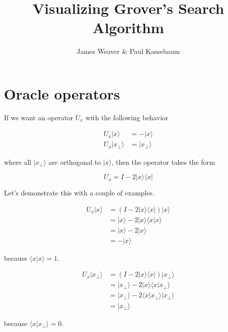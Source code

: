 \documentclass[12pt]{amsart}
\title{Visualizing Grover's Search Algorithm}
\author{James Weaver \& Paul Kassebaum}
\date{} %
\begin{document}
\maketitle

\section{Oracle operators}

If we want an operator $U_x$ with the following behavior

\begin{equation}
	\begin{split}
		U_x |x\rangle & = - |x\rangle \\
		U_x |x_\perp\rangle & = |x_\perp\rangle 
	\end{split}
\end{equation}

where all $|x_\perp\rangle$ are orthogonal to $|x\rangle$, then the operator takes the form

\begin{equation}
	U_x = I - 2 |x\rangle\langle x|
\end{equation}

Let's demonstrate this with a couple of examples.

\begin{equation}
	\begin{split}
		U_x |x\rangle & = (I - 2 |x\rangle\langle x| ) |x\rangle \\
		& = |x\rangle - 2 |x\rangle\langle x | x\rangle \\
		& = |x\rangle - 2 |x\rangle \\
		& = - |x\rangle
	\end{split}
\end{equation}

because $\langle x | x\rangle = 1$.

\begin{equation}
	\begin{split}
		U_x |x_\perp\rangle & = (I - 2 |x\rangle\langle x| ) |x_\perp\rangle \\
		& = |x_\perp\rangle - 2 |x\rangle\langle x | x_\perp\rangle \\
		& = |x_\perp\rangle - 2 \langle x | x_\perp\rangle  |x_\perp\rangle \\
		& = |x_\perp\rangle
	\end{split}
\end{equation}

because $\langle x | x_\perp\rangle = 0$.
\end{document}
